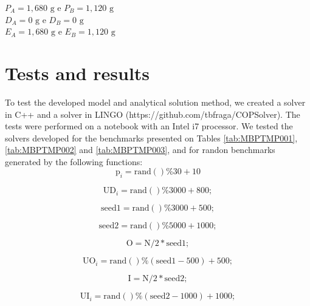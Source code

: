 \documentclass[authoryear,preprint,12pt]{elsarticle}
\begin{document}
$P_A = 1,680  \textrm{ g}$ e $P_B=1,120 \textrm{ g}$ \\

$D_A = 0 \textrm{ g}$ e $D_B = 0 \textrm{ g}$ \\

$E_A = 1,680 \textrm{ g}$ e $E_B = 1,120 \textrm{ g}$ \\

\section{Tests and results}
\label{sec:results}

To test the developed model and analytical solution method, we created a solver in C++ and a solver in LINGO (https://github.com/tbfraga/COPSolver). The tests were performed on a notebook with an Intel i7 processor. We tested the solvers developed for the benchmarks presented on Tables \ref{tab:MBPTMP001}, \ref{tab:MBPTMP002} and \ref{tab:MBPTMP003}, and for randon benchmarks generated by the following functions: \\

\begin{equation}
\textrm{p}_i = \textrm{rand}()\%30 + 10
\end{equation}

\begin{equation}
\textrm{UD}_i = \textrm{rand}()\%3000 + 800;
\end{equation}

\begin{equation}
 \textrm{seed1} = \textrm{rand}()\%3000 + 500;
\end{equation}

\begin{equation}
\textrm{seed2} = \textrm{rand}()\%5000 + 1000;
\end{equation}

\begin{equation}
\textrm{O} = \textrm{N}/2*\textrm{seed1};
\end{equation}

\begin{equation}
\textrm{UO}_i = \textrm{rand}()\%(\textrm{seed1}-500) + 500;
\end{equation}

\begin{equation}
\textrm{I} = \textrm{N}/2*\textrm{seed2};
\end{equation}

\begin{equation}
\textrm{UI}_i = \textrm{rand}()\%(\textrm{seed2}-1000) + 1000;
\end{equation}
\end{document}
